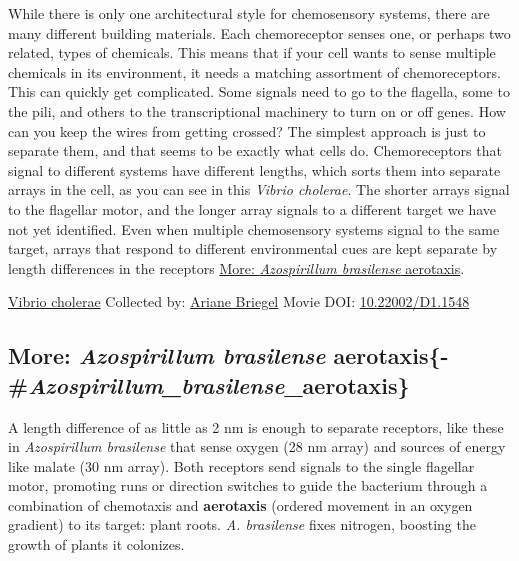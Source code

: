 \documentclass[]{tufte-book}
\begin{document}
While there is only one architectural style for chemosensory systems, there are many different building materials. Each chemoreceptor senses one, or perhaps two related, types of chemicals. This means that if your cell wants to sense multiple chemicals in its environment, it needs a matching assortment of chemoreceptors. This can quickly get complicated. Some signals need to go to the flagella, some to the pili, and others to the transcriptional machinery to turn on or off genes. How can you keep the wires from getting crossed? The simplest approach is just to separate them, and that seems to be exactly what cells do. Chemoreceptors that signal to different systems have different lengths, which sorts them into separate arrays in the cell, as you can see in this \emph{Vibrio cholerae}. The shorter arrays signal to the flagellar motor, and the longer array signals to a different target we have not yet identified. Even when multiple chemosensory systems signal to the same target, arrays that respond to different environmental cues are kept separate by length differences in the receptors \protect\hyperlink{ux2aAzospirillum_brasilenseux2a_aerotaxis}{More: \emph{Azospirillum brasilense} aerotaxis}.



\hypertarget{htmlwidget-e690749603965e03eb97}{}

\label{fig:7-4}\protect\hyperlink{tree}{Vibrio cholerae} Collected by: \protect\hyperlink{ariane_briegel}{Ariane Briegel} Movie DOI: \href{https://doi.org/10.22002/D1.1548}{10.22002/D1.1548}

\hypertarget{more-azospirillum-brasilense-aerotaxis-azospirillum_brasilense_aerotaxis}{%
\subsection{\texorpdfstring{More: \emph{Azospirillum brasilense} aerotaxis\{-\#\emph{Azospirillum\_brasilense}\_aerotaxis\}}{More: Azospirillum brasilense aerotaxis\{-\#Azospirillum\_brasilense\_aerotaxis\}}}\label{more-azospirillum-brasilense-aerotaxis-azospirillum_brasilense_aerotaxis}}

A length difference of as little as 2 nm is enough to separate receptors, like these in \emph{Azospirillum brasilense} that sense oxygen (28 nm array) and sources of energy like malate (30 nm array). Both receptors send signals to the single flagellar motor, promoting runs or direction switches to guide the bacterium through a combination of chemotaxis and \textbf{aerotaxis} (ordered movement in an oxygen gradient) to its target: plant roots. \emph{A. brasilense} fixes nitrogen, boosting the growth of plants it colonizes.
\end{document}
